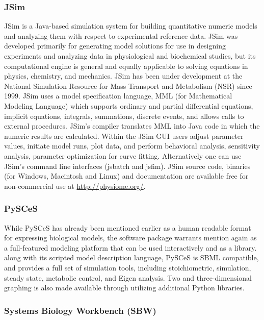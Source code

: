 \subsubsection{JSim \label{jsim}}

JSim \autocite{raymond03} is a Java-based simulation system for building
quantitative numeric models and analyzing them with respect to
experimental reference data. JSim was developed primarily for generating
model solutions for use in designing experiments and analyzing data in
physiological and biochemical studies, but its computational engine is
general and equally applicable to solving equations in physics,
chemistry, and mechanics. JSim has been under development at the
National Simulation Resource for Mass Transport and Metabolism (NSR)
since 1999. JSim uses a model specification language, MML (for
Mathematical Modeling Language) which supports ordinary and partial
differential equations, implicit equations, integrals, summations,
discrete events, and allows calls to external procedures. JSim's
compiler translates MML into Java code in which the numeric results are
calculated. Within the JSim GUI users adjust parameter values, initiate
model runs, plot data, and perform behavioral analysis, sensitivity
analysis, parameter optimization for curve fitting. Alternatively one
can use JSim's command line interfaces (jsbatch and jsfim). JSim source
code, binaries (for Windows, Macintosh and Linux) and documentation are
available free for non-commercial use at \url{http://physiome.org/}.

\subsubsection{PySCeS}

While PySCeS has already been mentioned earlier as a human readable
format for expressing biological models, the software package warrants
mention again as a full-featured modeling platform that can be used
interactively and as a library. along with its scripted model
description language, PySCeS is SBML compatible, and provides a full set
of simulation tools, including stoichiometric, simulation, steady state,
metabolic control, and Eigen analysis. Two and three-dimensional
graphing is also made available through utilizing additional Python
libraries.

\subsubsection{Systems Biology Workbench (SBW)}

